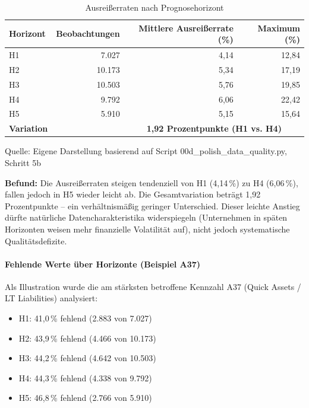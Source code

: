\begin{table}[htbp]
\centering
\caption{Ausreißerraten nach Prognosehorizont}
\label{tab:horizon_outliers}
\begin{tabular}{lrrr}
\toprule
\textbf{Horizont} & \textbf{Beobachtungen} & \textbf{Mittlere Ausreißerrate (\%)} & \textbf{Maximum (\%)} \\
\midrule
H1 & 7.027 & 4,14 & 12,84 \\
H2 & 10.173 & 5,34 & 17,19 \\
H3 & 10.503 & 5,76 & 19,85 \\
H4 & 9.792 & 6,06 & 22,42 \\
H5 & 5.910 & 5,15 & 15,64 \\
\midrule
\textbf{Variation} & & \multicolumn{2}{c}{\textbf{1,92 Prozentpunkte (H1 vs. H4)}} \\
\bottomrule
\end{tabular}
\par\smallskip
{\footnotesize Quelle: Eigene Darstellung basierend auf Script 00d\_polish\_data\_quality.py, Schritt 5b}
\end{table}

\textbf{Befund:} Die Ausreißerraten steigen tendenziell von H1 (4,14\,\%) zu H4 (6,06\,\%), fallen jedoch in H5 wieder leicht ab. Die Gesamtvariation beträgt 1,92 Prozentpunkte – ein verhältnismäßig geringer Unterschied. Dieser leichte Anstieg dürfte natürliche Datencharakteristika widerspiegeln (Unternehmen in späten Horizonten weisen mehr finanzielle Volatilität auf), nicht jedoch systematische Qualitätsdefizite.

\paragraph{Fehlende Werte über Horizonte (Beispiel A37)}

Als Illustration wurde die am stärksten betroffene Kennzahl A37 (Quick Assets / LT Liabilities) analysiert:

\begin{itemize}[topsep=0.2\baselineskip]
    \item H1: 41,0\,\% fehlend (2.883 von 7.027)
    \item H2: 43,9\,\% fehlend (4.466 von 10.173)
    \item H3: 44,2\,\% fehlend (4.642 von 10.503)
    \item H4: 44,3\,\% fehlend (4.338 von 9.792)
    \item H5: 46,8\,\% fehlend (2.766 von 5.910)
\end{itemize}


